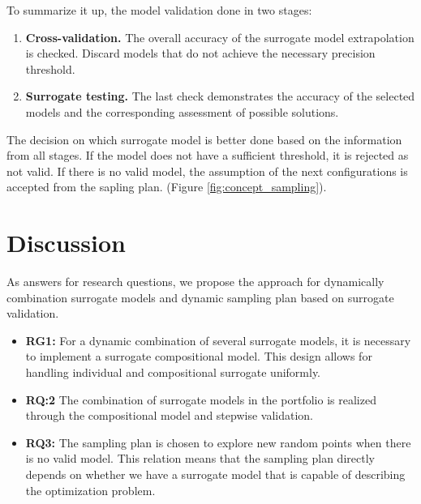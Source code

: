        To summarize it up, the model validation done in two stages:
        \begin{enumerate}
            \item \textbf{Cross-validation.} The overall accuracy of the surrogate model extrapolation is checked. Discard models that do not achieve the necessary precision threshold.
            \item \textbf{Surrogate testing.} The last check demonstrates the accuracy of the selected models and the corresponding assessment of possible solutions.
        \end{enumerate}
        
        The decision on which surrogate model is better done based on the information from all stages. If the model does not have a sufficient threshold, it is rejected as not valid. If there is no valid model, the assumption of the next configurations is accepted from the sapling plan. (Figure \ref{fig:concept_sampling}).

    

    \section{Discussion}
        As answers for research questions, we propose the approach for dynamically combination surrogate models and dynamic sampling plan based on surrogate validation.
        \begin{itemize}
            \item \textbf{RG1:} For a dynamic combination of several surrogate models, it is necessary to implement a surrogate compositional model. This design allows for handling individual and compositional surrogate uniformly.
            \item \textbf{RQ:2} The combination of surrogate models in the portfolio is realized through the compositional model and stepwise validation.
            \item \textbf{RQ3:} The sampling plan is chosen to explore new random points when there is no valid model. This relation means that the sampling plan directly depends on whether we have a surrogate model that is capable of describing the optimization problem.
        \end{itemize}
         
